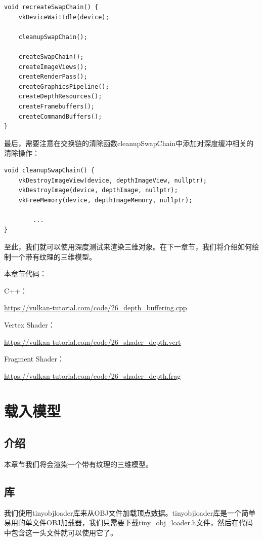 \documentclass{ctexart}
\begin{document}
\begin{lstlisting}[language={[ANSI]C}]
void recreateSwapChain() {
	vkDeviceWaitIdle(device);

	cleanupSwapChain();

	createSwapChain();
	createImageViews();
	createRenderPass();
	createGraphicsPipeline();
	createDepthResources();
	createFramebuffers();
	createCommandBuffers();
}
\end{lstlisting}

最后，需要注意在交换链的清除函数cleanupSwapChain中添加对深度缓冲相关的清除操作：

\begin{lstlisting}[language={[ANSI]C}]
void cleanupSwapChain() {
	vkDestroyImageView(device, depthImageView, nullptr);
	vkDestroyImage(device, depthImage, nullptr);
	vkFreeMemory(device, depthImageMemory, nullptr);

		...
}
\end{lstlisting}

至此，我们就可以使用深度测试来渲染三维对象。在下一章节，我们将介绍如何绘制一个带有纹理的三维模型。

本章节代码：

C++：

\url{https://vulkan-tutorial.com/code/26_depth_buffering.cpp}

Vertex Shader：

\url{https://vulkan-tutorial.com/code/26_shader_depth.vert}

Fragment Shader：

\url{https://vulkan-tutorial.com/code/26_shader_depth.frag}

\newpage
\section{载入模型}

\subsection{介绍}

本章节我们将会渲染一个带有纹理的三维模型。

\subsection{库}

我们使用tinyobjloader库来从OBJ文件加载顶点数据。tinyobjloader库是一个简单易用的单文件OBJ加载器，我们只需要下载tiny\_obj\_loader.h文件，然后在代码中包含这一头文件就可以使用它了。
\end{document}
